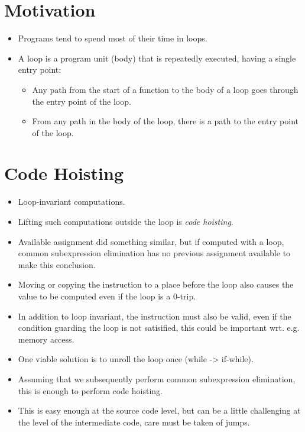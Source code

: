 \tableofcontents

\section{Motivation}

\begin{itemize}

\item Programs tend to spend most of their time in loops.

\item A loop is a program unit (body) that is repeatedly executed, having a
single entry point:

\begin{itemize}

\item Any path from the start of a function to the body of a loop goes through
the entry point of the loop.

\item From any path in the body of the loop, there is a path to the entry point
of the loop.

\end{itemize}

\end{itemize}

\section{Code Hoisting}

\begin{itemize}

\item Loop-invariant computations.

\item Lifting such computations outside the loop is \emph{code hoisting}.

\item Available assignment did something similar, but if computed with a loop,
common subexpression elimination has no previous assignment available to make
this conclusion.

\item Moving or copying the instruction to a place before the loop also causes
the value to be computed even if the loop is a 0-trip.

\item In addition to loop invariant, the instruction must also be valid, even
if the condition guarding the loop is not satisified, this could be important
wrt.  e.g. memory access.

\item One viable solution is to unroll the loop once (while -> if-while).

\item Assuming that we subsequently perform common subexpression elimination,
this is enough to perform code hoisting.

\item This is easy enough at the source code level, but can be a little
challenging at the level of the intermediate code, care must be taken of jumps.

\end{itemize}

